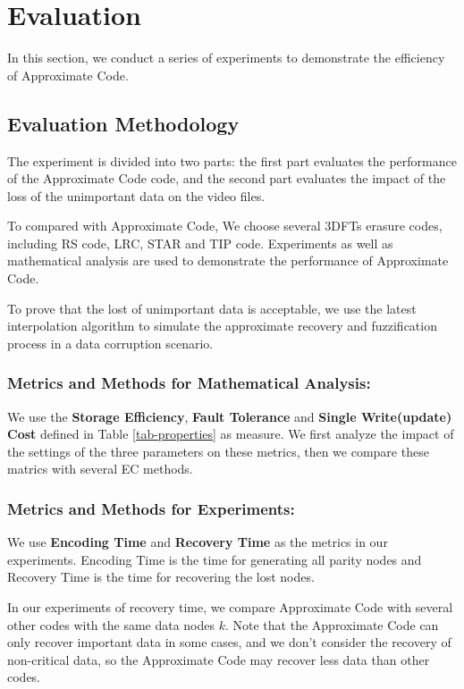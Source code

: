 \documentclass[sigconf]{acmart}
\begin{document}
\section{Evaluation}\label{evaluation}
In this section, we conduct a series of experiments to demonstrate the efficiency of Approximate Code. 
\subsection{Evaluation Methodology}
The experiment is divided into two parts: the first part evaluates the performance of the Approximate Code code, and the second part evaluates the impact of the loss of the unimportant data on the video files.

To compared with Approximate Code, We choose several 3DFTs erasure codes, including RS code, LRC, STAR and TIP code.
Experiments as well as mathematical analysis are used to demonstrate the performance of Approximate Code.

To prove that the lost of unimportant data is acceptable, we use the latest interpolation algorithm to simulate the approximate recovery and fuzzification process in a data corruption scenario.

\subsubsection{Metrics and Methods for Mathematical Analysis: }
We use the \textbf{Storage Efficiency}, \textbf{Fault Tolerance} and \textbf{Single Write(update) Cost} defined in Table \ref{tab-properties} as measure.
We first analyze the impact of the settings of the three parameters on these metrics, then we compare these matrics with several EC methods.

\subsubsection{Metrics and Methods for Experiments: }
We use \textbf{Encoding Time} and \textbf{Recovery Time} as the metrics in our experiments. Encoding Time is the time for generating all parity nodes and Recovery Time is the time for recovering the lost nodes.  

In our experiments of recovery time, we compare Approximate Code with several other codes with the same data nodes $k$. 
Note that the Approximate Code can only recover important data in some cases, and we don't consider the recovery of non-critical data, so the Approximate Code may recover less data than other codes.
\end{document}
